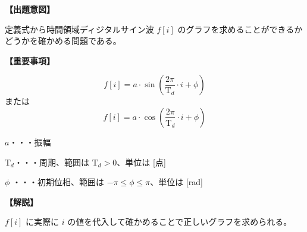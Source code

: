 \noindent \textbf{【出題意図】}

\noindent 定義式から時間領域ディジタルサイン波 $f[i]$ のグラフを求めることができるかどうかを確かめる問題である。

\vspace{1em}
\noindent \textbf{【重要事項】}

\[
f[i] = a \cdot \sin \left ( \frac{2 \pi}{\textrm{T}_d}  \cdot i + \phi \right )
\]
%
\noindent または
%
\[
f[i] = a \cdot \cos \left ( \frac{2 \pi}{\textrm{T}_d}  \cdot i + \phi \right )
\]

\bigskip
\noindent $a$・・・振幅

\bigskip
\noindent $\textrm{T}_d$・・・周期、範囲は $\textrm{T}_d > 0$、単位は [点]

\bigskip
\noindent $\phi$ ・・・初期位相、範囲は $-\pi \leq \phi \leq \pi$、単位は [rad]


\vspace{1em}
\noindent \textbf{【解説】}

\noindent $f[i]$ に実際に $i$ の値を代入して確かめることで正しいグラフを求められる。
